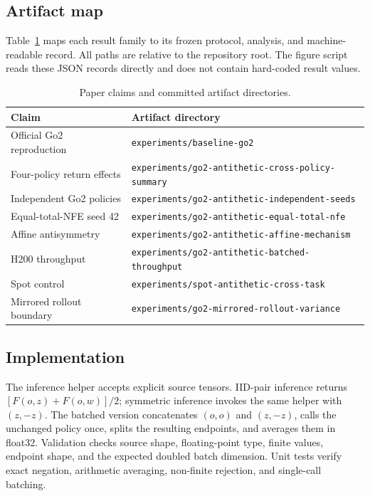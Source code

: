 \documentclass{article}
\begin{document}
\subsection{Artifact map}

Table~\ref{tab:artifacts} maps each result family to its frozen protocol,
analysis, and machine-readable record. All paths are relative to the repository
root. The figure script reads these JSON records directly and does not contain
hard-coded result values.

\begin{table}[h]
  \caption{Paper claims and committed artifact directories.}
  \label{tab:artifacts}
  \centering
  \small
  \begin{tabular}{ll}
    \toprule
    Claim & Artifact directory \\
    \midrule
    Official Go2 reproduction & \texttt{experiments/baseline-go2} \\
    Four-policy return effects & \texttt{experiments/go2-antithetic-cross-policy-summary} \\
    Independent Go2 policies & \texttt{experiments/go2-antithetic-independent-seeds} \\
    Equal-total-NFE seed 42 & \texttt{experiments/go2-antithetic-equal-total-nfe} \\
    Affine antisymmetry & \texttt{experiments/go2-antithetic-affine-mechanism} \\
    H200 throughput & \texttt{experiments/go2-antithetic-batched-throughput} \\
    Spot control & \texttt{experiments/spot-antithetic-cross-task} \\
    Mirrored rollout boundary & \texttt{experiments/go2-mirrored-rollout-variance} \\
    \bottomrule
  \end{tabular}
\end{table}

\subsection{Implementation}

The inference helper accepts explicit source tensors. IID-pair inference returns
$[F(o,z)+F(o,w)]/2$; symmetric inference invokes the same helper with $(z,-z)$.
The batched version concatenates $(o,o)$ and $(z,-z)$, calls the unchanged policy
once, splits the resulting endpoints, and averages them in float32. Validation
checks source shape, floating-point type, finite values, endpoint shape, and the
expected doubled batch dimension. Unit tests verify exact negation, arithmetic
averaging, non-finite rejection, and single-call batching.
\end{document}
